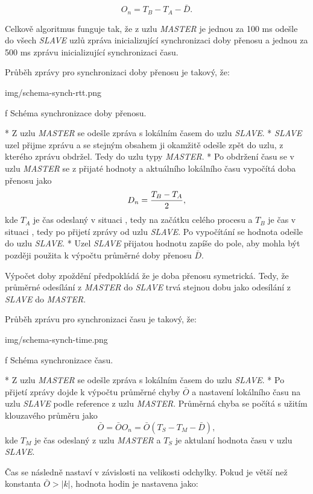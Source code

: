 $$
O_n = T_B - T_A - \bar{D}.
$$

Celkově algoritmus funguje tak, že z uzlu {\em MASTER} je jednou za 100 ms odešle do všech {\em SLAVE} uzlů zpráva inicializující synchronizaci {\sbf doby přenosu} a jednou za 500 ms zprávu inicializující synchronizaci {\sbf času}.

Průběh zprávy pro synchronizaci {\sbf doby přenosu} je takový, že:

\medskip
{}
\picw=16cm \cinspic img/schema-synch-rtt.png
\caption/f Schéma synchronizace doby přenosu.
\medskip

\begitems
* {\sbf [A]} Z uzlu {\em MASTER} se odešle zpráva s lokálním časem do uzlu {\em SLAVE}.
* {\sbf [B]} {\em SLAVE} uzel přijme zprávu a se stejným obsahem ji okamžitě odešle zpět do uzlu, z kterého zprávu obdržel. Tedy do uzlu typy {\em MASTER}.
* {\sbf [C]} Po obdržení času se v uzlu {\em MASTER} se z přijaté hodnoty a aktuálního lokálního času vypočítá doba přenosu jako
$$
D_n = {{T_B - T_A}\over{2}},
$$
kde $T_A$ je čas odeslaný v situaci {\sbf [A]}, tedy na začátku celého procesu a $T_B$ je čas v situaci {\sbf [C]}, tedy po přijetí zprávy od uzlu {\em SLAVE}. Po vypočítání se hodnota odešle do uzlu {\em SLAVE}.
* {\sbf [D]} Uzel {\em SLAVE} přijatou hodnotu zapíše do pole, aby mohla být později použita k výpočtu průměrné doby přenosu $\bar{D}$.
\enditems

Výpočet doby zpoždění předpokládá že je doba přenosu symetrická. Tedy, že průměrné odesílání z {\em MASTER} do {\em SLAVE} trvá stejnou dobu jako odesílání z {\em SLAVE} do {\em MASTER}.

Průběh zprávu pro synchronizaci {\sbf času} je takový, že:

\medskip
{}
\picw=16cm \cinspic img/schema-synch-time.png
\caption/f Schéma synchronizace času.
\medskip

\begitems
* {\sbf [A]} Z uzlu {\em MASTER} se odešle zpráva s lokálním časem do uzlu {\em SLAVE}.
* {\sbf [B]} Po přijetí zprávy dojde k výpočtu průměrné chyby $\bar{O}$ a nastavení lokálního času na uzlu {\em SLAVE} podle reference z uzlu {\em MASTER}. Průměrná chyba se počítá s užitím klouzavého průměru jako 
$$
\bar{O} = \bar{O} O_n = \bar{O} (T_S - T_M - \bar{D}),
$$
kde $T_M$ je čas odeslaný z uzlu {\em MASTER} a $T_S$ je aktulaní hodnota času v uzlu {\em SLAVE}.

Čas se následně nastaví v závislosti na velikosti odchylky. Pokud je větší než konstanta $\bar{O} > | k |$, hodnota hodin je nastavena jako:

